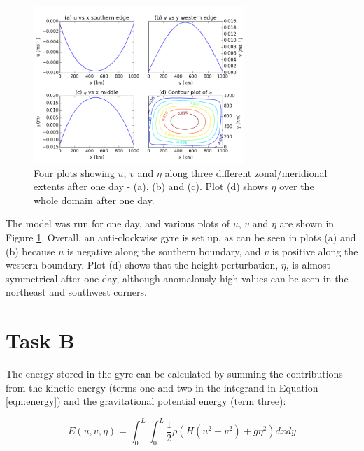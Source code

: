 \documentclass{article}
\begin{document}
\begin{figure}[ht!]
    \centering
    \includegraphics[width=300px]{figures/task_a}
    \caption{Four plots showing $u$, $v$ and $\eta$ along three different zonal/meridional extents
	after one day - (a), (b) and (c). Plot (d) shows $\eta$ over the whole domain after one
    day.}
    \label{fig:task_a}
\end{figure}

The model was run for one day, and various plots of $u$, $v$ and $\eta$ are shown in Figure
\ref{fig:task_a}. Overall, an anti-clockwise gyre is set up, as can be seen in plots (a) and (b)
because $u$ is negative along the southern boundary, and $v$ is positive along the western boundary.
Plot (d) shows that the height perturbation, $\eta$, is almost symmetrical after one day, although
anomalously high values can be seen in the northeast and southwest corners.

\section*{Task B}

The energy stored in the gyre can be calculated by summing the contributions from the kinetic energy
(terms one and two in the integrand in Equation \ref{eqn:energy}) and the gravitational potential
energy (term three):

\begin{equation}
    \label{eqn:energy} 
    E(u, v, \eta) = \int_0^L \int_0^L \frac{1}{2} \rho ( H ( u^2 + v^2) + g \eta^2) dx dy
\end{equation}
\end{document}
